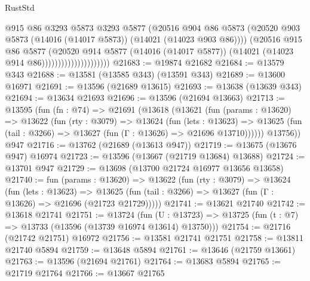 \begin{lexlean}{RustStd}
\begin{coremodule}
                                      @915
                                      @86
                                      @3293
                                      @5873
                                      @3293
                                      @5877
                                      (@20516
                                        @904
                                        @86
                                        @5873
                                        (@20520
                                          @903
                                          @5873
                                          (@14016 (@14017 @5873))
                                          (@14021 (@14023 @903 @86))))
                                      (@20516
                                        @915
                                        @86
                                        @5877
                                        (@20520
                                          @914
                                          @5877
                                          (@14016 (@14017 @5877))
                                          (@14021 (@14023 @914 @86)))))))))))))))))))))
@21683 := @19874 @21682
@21684 := @13579 @343
@21688 := @13581 (@13585 @343) (@13591 @343)
@21689 := @13600 @16971
@21691 := @13596 (@21689 @13615)
@21693 := @13638 (@13639 @343)
@21694 := @13634 @21693
@21696 := @13596 (@21694 @13663)
@21713 := @13595
    (fun (fn : @74) =>
    @21691
      (@13618
        (@13621
          (fun (params : @13620) =>
          @13622
            (fun (rty : @3079) =>
            @13624
              (fun (lets : @13623) =>
              @13625 (fun (tail : @3266) => @13627 (fun (Γ : @13626) => @21696 @13710))))))
        @13756))
    @947
@21716 := @13762 (@21689 (@13613 @947))
@21719 := @13675 (@13676 @947) @16974
@21723 := @13596 (@13667 (@21719 @13684) @13688)
@21724 := @13701 @947
@21729 := @13698 (@13700 @21724 @16977 @13656 @13658)
@21740 := fun (params : @13620) =>
  @13622
    (fun (rty : @3079) =>
    @13624
      (fun (lets : @13623) =>
      @13625 (fun (tail : @3266) => @13627 (fun (Γ : @13626) => @21696 (@21723 @21729)))))
@21741 := @13621 @21740
@21742 := @13618 @21741
@21751 := @13724
    (fun (U : @13723) => @13725 (fun (t : @7) => @13733 (@13596 (@13739 @16974 @13614) @13750)))
@21754 := @21716 (@21742 @21751) @16972
@21756 := @13581 @21741 @21751
@21758 := @13811 @21740 @5894
@21759 := @13648 @5894
@21761 := @13646 (@21759 @13661)
@21763 := @13596 (@21694 @21761)
@21764 := @13683 @5894
@21765 := @21719 @21764
@21766 := @13667 @21765

\end{coremodule}
\end{lexlean}
